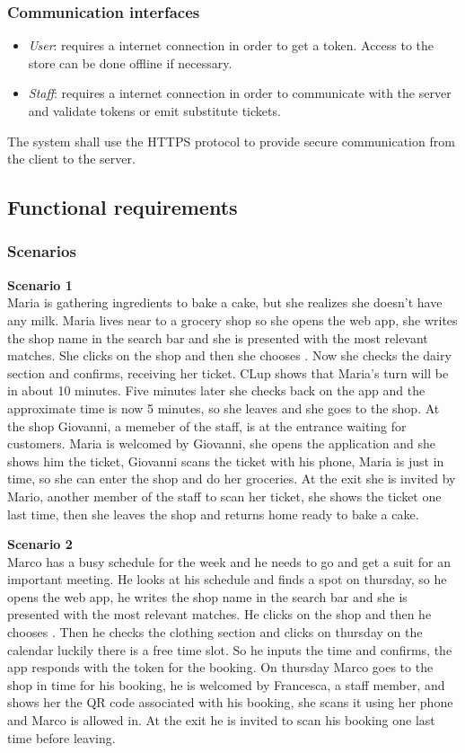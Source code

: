 \subsubsection{Communication interfaces}
\begin{itemize}
    \item \emph{User}: requires a internet connection in order to get a token. Access to the store can be done offline if necessary.
    \item \emph{Staff}: requires a internet connection in order to communicate with the server and validate tokens or emit substitute tickets.
\end{itemize}
The system shall use the HTTPS protocol to provide secure communication from the client to the server.
\subsection{Functional requirements}
\subsubsection{Scenarios}
\textbf{Scenario 1}\\
Maria is gathering ingredients to bake a cake, but she realizes she doesn't have any milk.
Maria lives near to a grocery shop so she opens the web app, she writes the shop name in the search bar and she is presented with the most relevant matches. She clicks on the shop and then she chooses . Now she checks the dairy section and confirms, receiving her ticket.
CLup shows that Maria's turn will be in about 10 minutes. Five minutes later she checks back on the app and the approximate time is now 5 minutes, so she leaves and she goes to the shop.
At the shop Giovanni, a memeber of the staff, is at the entrance waiting for customers. Maria is welcomed by Giovanni, she opens the application and she shows him the ticket, Giovanni scans the ticket with his phone, Maria is just in time, so she can enter the shop and do her groceries.
At the exit she is invited by Mario, another member of the staff to scan her ticket, she shows the ticket one last time, then she leaves the shop and returns home ready to bake a cake.

\textbf{Scenario 2}\\
Marco has a busy schedule for the week and he needs to go and get a suit for an important meeting. He looks at his schedule and finds a spot on thursday, so he opens the web app, he writes the shop name in the search bar and she is presented with the most relevant matches. He clicks on the shop and then he chooses . Then he checks the clothing section and clicks on thursday on the calendar luckily there is a free time slot. So he inputs the time and confirms, the app responds with the token for the booking. On thursday Marco goes to the shop in time for his booking, he is welcomed by Francesca, a staff member, and shows her the QR code associated with his booking, she scans it using her phone and Marco is allowed in. At the exit he is invited to scan his booking one last time before leaving.

